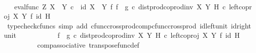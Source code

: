 \begin{isabellebody}
\ \ \ \ \ \ \isamarkupfalse%
\ \isamarkupfalse%
\ {\isachardoublequoteopen}{\isachardot}{\kern0pt}{\isachardot}{\kern0pt}{\isachardot}{\kern0pt}\ {\isacharequal}{\kern0pt}\ {\isacharparenleft}{\kern0pt}eval{\isacharunderscore}{\kern0pt}func\ Z\ {\isacharparenleft}{\kern0pt}X\ {\isasymCoprod}\ Y{\isacharparenright}{\kern0pt}\ {\isasymcirc}\isactrlsub c\ \ {\isacharparenleft}{\kern0pt}id\ {\isacharparenleft}{\kern0pt}X\ {\isasymCoprod}\ Y{\isacharparenright}{\kern0pt}\ {\isasymtimes}\isactrlsub f\ {\isacharparenleft}{\kern0pt}f\isactrlsup {\isasymflat}\ {\isasymamalg}\ g\isactrlsup {\isasymflat}\ {\isasymcirc}\isactrlsub c\ dist{\isacharunderscore}{\kern0pt}prod{\isacharunderscore}{\kern0pt}coprod{\isacharunderscore}{\kern0pt}inv{}\ X\ Y\ H{\isacharparenright}{\kern0pt}\isactrlsup {\isasymsharp}{\isacharparenright}{\kern0pt}\ {\isasymcirc}\isactrlsub c\ {\isacharparenleft}{\kern0pt}left{\isacharunderscore}{\kern0pt}coproj\ X\ Y\ {\isasymtimes}\isactrlsub f\ id\ H{\isacharparenright}{\kern0pt}{\isacharparenright}{\kern0pt}\isactrlsup {\isasymsharp}{\isachardoublequoteclose}\isanewline
\ \ \ \ \ \ \ \ \isamarkupfalse%
\ {\isacharparenleft}{\kern0pt}typecheck{\isacharunderscore}{\kern0pt}cfuncs{\isacharcomma}{\kern0pt}\ simp\ add{\isacharcolon}{\kern0pt}\ cfunc{\isacharunderscore}{\kern0pt}cross{\isacharunderscore}{\kern0pt}prod{\isacharunderscore}{\kern0pt}comp{\isacharunderscore}{\kern0pt}cfunc{\isacharunderscore}{\kern0pt}cross{\isacharunderscore}{\kern0pt}prod\ id{\isacharunderscore}{\kern0pt}left{\isacharunderscore}{\kern0pt}unit{}\ id{\isacharunderscore}{\kern0pt}right{\isacharunderscore}{\kern0pt}unit{}{\isacharparenright}{\kern0pt}\isanewline
\ \ \ \ \ \ \isamarkupfalse%
\ \isamarkupfalse%
\ {\isachardoublequoteopen}{\isachardot}{\kern0pt}{\isachardot}{\kern0pt}{\isachardot}{\kern0pt}\ {\isacharequal}{\kern0pt}\ {\isacharparenleft}{\kern0pt}f\isactrlsup {\isasymflat}\ {\isasymamalg}\ g\isactrlsup {\isasymflat}\ {\isasymcirc}\isactrlsub c\ {\isacharparenleft}{\kern0pt}dist{\isacharunderscore}{\kern0pt}prod{\isacharunderscore}{\kern0pt}coprod{\isacharunderscore}{\kern0pt}inv{}\ X\ Y\ H\ {\isasymcirc}\isactrlsub c\ left{\isacharunderscore}{\kern0pt}coproj\ X\ Y\ {\isasymtimes}\isactrlsub f\ id\ H{\isacharparenright}{\kern0pt}{\isacharparenright}{\kern0pt}\isactrlsup {\isasymsharp}{\isachardoublequoteclose}\isanewline
\ \ \ \ \ \ \ \ \isamarkupfalse%
\ comp{\isacharunderscore}{\kern0pt}associative{}\ transpose{\isacharunderscore}{\kern0pt}func{\isacharunderscore}{\kern0pt}def\ \isamarkupfalse%

\end{isabellebody}
